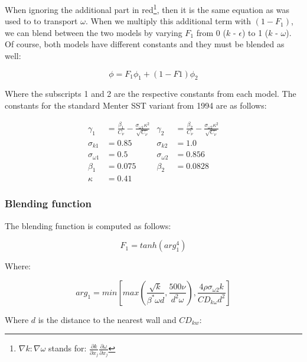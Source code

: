 \noindent When ignoring the additional part in red\footnote{$\nabla k : \nabla
\omega$ stands for: $\frac{\partial k}{\partial x_j} \frac{\partial
\omega}{\partial x_j}$}, then it is the same equation as was used to to
transport $\omega$. When we multiply this additional term with $(1 - F_1)$, we
can blend between the two models by varying $F_1$ from 0 ($k$ - $\epsilon$) to
1 ($k$ - $\omega$). Of course, both models have different constants and they
must be blended as well:

\begin{equation}
    \phi = F_1 \phi_1 + (1 - F1) \phi_2
\end{equation}

\noindent Where the subscripts 1 and 2 are the respective constants from each
model. The constants for the standard Menter SST variant from 1994  are as
follows: \cite{nasatmr}

\begin{align*}
    \gamma_1 &= \frac{\beta_1}{C_{\nu}} - 
    \frac{\sigma_{\omega 1} \kappa^2}{\sqrt{C_{\nu}}}
    & \gamma_2 &= \frac{\beta_2}{C_{\nu}} - 
    \frac{\sigma_{\omega 2} \kappa^2}{\sqrt{C_{\nu}}}\\
%
    \sigma_{k 1}        &= 0.85  & \sigma_{k 2}         &= 1.0 \\
    \sigma_{\omega 1}   &= 0.5   & \sigma_{\omega 2}    &= 0.856 \\
    \beta_1             &= 0.075 & \beta_2              &= 0.0828 \\
    \kappa              &= 0.41
\end{align*}


\subsubsection{Blending function}
The blending function is computed as follows:

\begin{equation}
    \label{eq:f1}
    F_1 = tanh(arg_1^4)
\end{equation}

\noindent Where:

\begin{equation}
    \label{eq:arg1}
    arg_1 = min \left[ max \left( 
    \frac{\sqrt{k}}{\beta^{*} \omega d}, \frac{500 \nu}{d^2 \omega}
    \right), 
    \frac{4 \rho \sigma_{\omega 2} k}{CD_{k \omega} d^2}
    \right]
\end{equation}

\noindent Where $d$ is the distance to the nearest wall and $CD_{kw}$:

